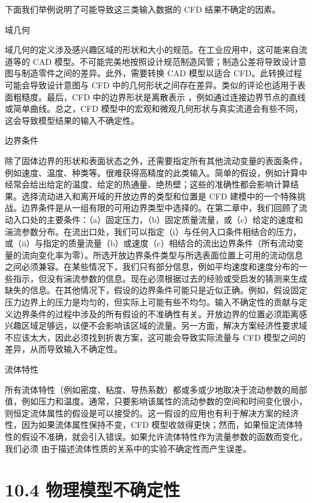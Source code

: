 \documentclass[11pt,a4paper,openany,fontset=none]{ctexbook}
\begin{document}
下面我们举例说明了可能导致这三类输入数据的 CFD 结果不确定的因素。

域几何

域几何的定义涉及感兴趣区域的形状和大小的规范。在工业应用中，这可能来自流道等的 CAD 模型。不可能完美地按照设计规范制造风管；制造公差将导致设计意图与制造零件之间的差异。此外，需要转换 CAD 模型以适合 CFD。此转换过程可能会导致设计意图与 CFD 中的几何形状之间存在差异。类似的评论也适用于表面粗糙度。最后，CFD 中的边界形状是离散表示
，例如通过连接边界节点的直线或简单曲线。总之，CFD 模型中的宏观和微观几何形状与真实流道会有些不同，这会导致模型结果的输入不确定性。

边界条件

除了固体边界的形状和表面状态之外，还需要指定所有其他流动变量的表面条件，例如速度、温度、种类等。很难获得高精度的此类输入。简单的假设，例如计算中经常会给出给定的温度、给定的热通量、绝热壁；这些的准确性都会影响计算结果。选择流动进入和离开域的开放边界的类型和位置是 CFD 建模中的一个特殊挑战。边界条件是从一组有限的可用边界类型中选择的。在第二章中，我们回顾了流动入口处的主要条件：（a）固定压力，（b）固定质量流量，或（c）给定的速度和湍流参数分布。在流出口处，我们可以指定（i）与任何入口条件相结合的压力，或（ii）与指定的质量流量（b）或速度（c）相结合的流出边界条件（所有流动变量的流向变化率为零）。所选开放边界条件类型与所选表面位置上可用的流动信息之间必须兼容。在某些情况下，我们只有部分信息，例如平均速度和速度分布的一些指示，但没有湍流参数的信息。现在必须根据过去的经验或受启发的猜测来生成缺失的信息。在其他情况下，假设的边界条件可能只是近似正确。例如，假设固定压力边界上的压力是均匀的，但实际上可能有些不均匀。输入不确定性的贡献与定义边界条件的过程中涉及的所有假设的不准确性有关。开放边界的位置必须距离感兴趣区域足够远，以便不会影响该区域的流量。另一方面，解决方案经济性要求域不应该太大，因此必须找到折衷方案，这可能会导致实际流量与 CFD 模型之间的差异，从而导致输入不确定性。

流体特性

所有流体特性（例如密度、粘度、导热系数）都或多或少地取决于流动参数的局部值，例如压力和温度。通常，只要影响该属性的流动参数的空间和时间变化很小，则恒定流体属性的假设是可以接受的。这一假设的应用也有利于解决方案的经济性，因为如果流体属性保持不变，CFD 模型收敛得更快；然而，如果恒定流体特性的假设不准确，就会引入错误。如果允许流体特性作为流量参数的函数而变化，我们必须
由于描述流体性质的关系中的实验不确定性而产生误差。

\section*{10.4 物理模型不确定性}
\end{document}

